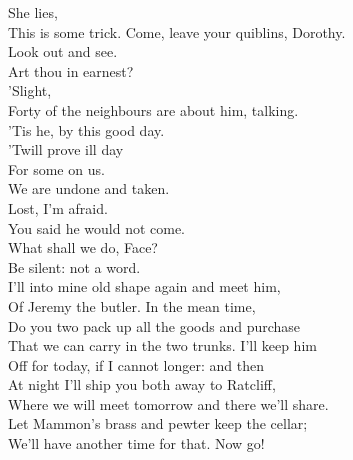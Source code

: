 \documentclass[a4paper,oneside,12pt]{memoir}
\begin{document}
\begin{drama*}
\facespeaks {} She lies,\\
This is some trick. Come, leave your quiblins, Dorothy.\\
\dolspeaks Look out and see.\\
\subtlespeaks {} Art thou in earnest?\\
\dolspeaks {} 'Slight,\\
Forty of the neighbours are about him, talking.\\
\facespeaks 'Tis he, by this good day.\\
\dolspeaks {} 'Twill prove ill day\\
For some on us.\\
\facespeaks {} We are undone and taken.\\
\dolspeaks Lost, I'm afraid.\\
\subtlespeaks {} You said he would not come.\\
What shall we do, Face?\\
\facespeaks {} Be silent: not a word.\\
I'll into mine old shape again and meet him,\\
Of Jeremy the butler. In the mean time,\\
Do you two pack up all the goods and purchase\\
That we can carry in the two trunks. I'll keep him\\
Off for today, if I cannot longer: and then\\
At night I'll ship you both away to Ratcliff,\\
Where we will meet tomorrow and there we'll share.\\
Let Mammon's brass and pewter keep the cellar;\\
We'll have another time for that. Now go!\\

\pagebreak
\scene


\end{drama*}
\end{document}
